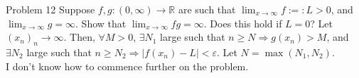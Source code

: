 \documentclass[10pt]{extarticle}
\newcommand{\R}{\mathbb{R}}
\begin{document}
  \begin{problem}{Problem 12}
    Suppose $f,g:(0,\infty)\rightarrow \R$ are such that $\lim_{x\rightarrow\infty} f:=: L > 0$, and $\lim_{x\rightarrow \infty}g = \infty$. Show that $\lim_{x\rightarrow \infty}fg = \infty$. Does this hold if $L = 0$?
    \tcblower
    Let $(x_n)_n \rightarrow \infty$. Then, $\forall M > 0$, $\exists N_1$ large such that $n\geq N \Rightarrow g(x_n) > M$, and $\exists N_2$ large such that $n\geq N_2 \Rightarrow |f(x_n) - L| < \varepsilon$. Let $N = \max(N_1,N_2)$.\\

    I don't know how to commence further on the problem.
  \end{problem}
\end{document}
